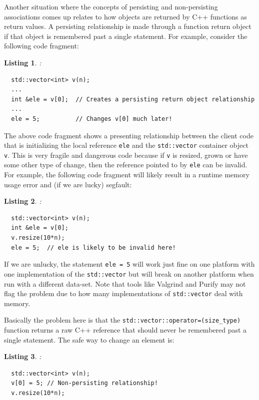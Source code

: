 \documentclass[pdf,ps2pdf,11pt]{SANDreport}
\newtheorem{listing}{Listing}
\begin{document}
Another situation where the concepts of persisting and non-persisting
associations comes up relates to how objects are returned by C++
functions as return values.  A persisting relationship is made through
a function return object if that object is remembered past a single
statement.  For example, consider the following code fragment:

\begin{listing}:\\
{\small\begin{verbatim}
  std::vector<int> v(n);
  ...
  int &ele = v[0];  // Creates a persisting return object relationship
  ...
  ele = 5;          // Changes v[0] much later!
\end{verbatim}}
\end{listing}

The above code fragment shows a presenting relationship between the
client code that is initializing the local reference {}\texttt{ele}
and the {}\texttt{std::vector} container object {}\texttt{v}.  This is
very fragile and dangerous code because if {}\texttt{v} is resized,
grown or have some other type of change, then the reference pointed to
by {}\texttt{ele} can be invalid.  For example, the following code
fragment will likely result in a runtime memory usage error and (if
we are lucky) segfault:

\begin{listing}:\\
{\small\begin{verbatim}
  std::vector<int> v(n);
  int &ele = v[0];
  v.resize(10*n);
  ele = 5;  // ele is likely to be invalid here!
\end{verbatim}}
\end{listing}

If we are unlucky, the statement {}\texttt{ele = 5} will work just
fine on one platform with one implementation of the
{}\texttt{std::vector} but will break on another platform when run
with a different data-set.  Note that tools like Valgrind and Purify
may not flag the problem due to how many implementations of
{}\texttt{std::vector} deal with memory.

Basically the problem here is that the
{}\texttt{std::vector::operator=(size\_type)} function returns a raw
C++ reference that should never be remembered past a single statement.
The safe way to change an element is:

\begin{listing}:\\
{\small\begin{verbatim}
  std::vector<int> v(n);
  v[0] = 5; // Non-persisting relationship!
  v.resize(10*n);
\end{verbatim}}
\end{listing}
\end{document}
